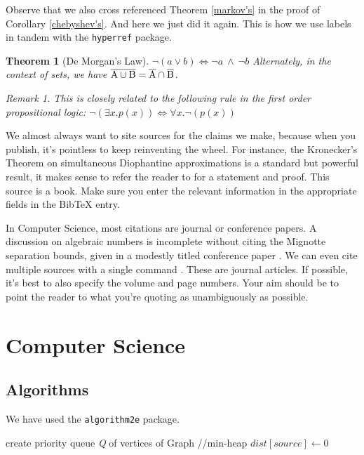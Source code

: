 \documentclass[10pt]{article}
\newtheorem{theorem}{Theorem}
\theoremstyle{remark}
\newtheorem*{remark}{Remark}
\begin{document}
Observe that we also cross referenced Theorem \ref{markov's} in the proof of Corollary \ref{chebyshev's}. And here we just did it again. This is how we use labels in tandem with the \verb!hyperref! package.
\begin{theorem}[De Morgan's Law]
\label{morgan}
$\neg (a \lor b) \iff \neg a~\land~\neg b$ 
Alternately, in the context of sets, we have $\overline{\rm A \cup B} = \overline{\rm A} \cap \overline{\rm B}$.



\begin{remark}
This is closely related to the following rule in the first order propositional logic: $\neg(\exists x.p(x)) \iff \forall x.\neg(p(x))$
\end{remark}
\end{theorem}	



We almost always want to site sources for the claims we make, because when you publish, it's pointless to keep reinventing the wheel. For instance, the Kronecker's Theorem on simultaneous Diophantine approximations is a standard but powerful result, it makes sense to refer the reader to \cite[Chap. 7, Sec. 1.3, Prop. 7]{bourbaki1966general} for a statement and proof. This source is a book. Make sure you enter the relevant information in the appropriate fields in the BibTeX entry.


In Computer Science, most citations are journal or conference papers. A discussion on algebraic numbers is incomplete without citing the Mignotte separation bounds, given in a modestly titled conference paper \cite{mignotte1982some}. We can even cite multiple sources with a single command \cite{bell2007positivity,renegar1992computational}. These are journal articles. If possible, it's best to also specify the volume and page numbers. Your aim should be to point the reader to what you're quoting as unambiguously as possible.
\clearpage
\renewcommand{\baselinestretch}{1}
\section{Computer Science}
\label{cs}
	\subsection{Algorithms}


	We have used the \verb!algorithm2e! package.


	\begin{algorithm}
	\DontPrintSemicolon
	create priority queue \textit{Q} of vertices of Graph //min-heap\;
	$dist[source]\leftarrow 0$\;
	\;
	\caption{Dijkstra's Algorithm}\label{shortest_distance}
	\end{algorithm}
\end{document}
